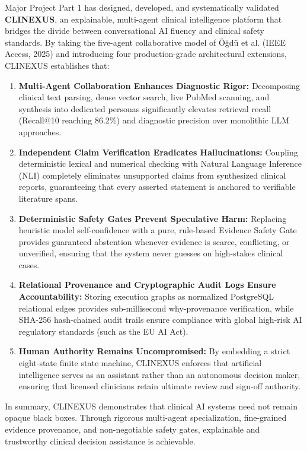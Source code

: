 \documentclass[12pt,a4paper]{report}
\begin{document}
Major Project Part 1 has designed, developed, and systematically validated \textbf{CLINEXUS}, an explainable, multi-agent clinical intelligence platform that bridges the divide between conversational AI fluency and clinical safety standards. By taking the five-agent collaborative model of Öğdü et al. (IEEE Access, 2025) and introducing four production-grade architectural extensions, CLINEXUS establishes that:
\begin{enumerate}
    \item \textbf{Multi-Agent Collaboration Enhances Diagnostic Rigor:} Decomposing clinical text parsing, dense vector search, live PubMed scanning, and synthesis into dedicated personas significantly elevates retrieval recall (Recall@10 reaching 86.2\%) and diagnostic precision over monolithic LLM approaches.
    \item \textbf{Independent Claim Verification Eradicates Hallucinations:} Coupling deterministic lexical and numerical checking with Natural Language Inference (NLI) completely eliminates unsupported claims from synthesized clinical reports, guaranteeing that every asserted statement is anchored to verifiable literature spans.
    \item \textbf{Deterministic Safety Gates Prevent Speculative Harm:} Replacing heuristic model self-confidence with a pure, rule-based Evidence Safety Gate provides guaranteed abstention whenever evidence is scarce, conflicting, or unverified, ensuring that the system never guesses on high-stakes clinical cases.
    \item \textbf{Relational Provenance and Cryptographic Audit Logs Ensure Accountability:} Storing execution graphs as normalized PostgreSQL relational edges provides sub-millisecond why-provenance verification, while SHA-256 hash-chained audit trails ensure compliance with global high-risk AI regulatory standards (such as the EU AI Act).
    \item \textbf{Human Authority Remains Uncompromised:} By embedding a strict eight-state finite state machine, CLINEXUS enforces that artificial intelligence serves as an assistant rather than an autonomous decision maker, ensuring that licensed clinicians retain ultimate review and sign-off authority.
\end{enumerate}

In summary, CLINEXUS demonstrates that clinical AI systems need not remain opaque black boxes. Through rigorous multi-agent specialization, fine-grained evidence provenance, and non-negotiable safety gates, explainable and trustworthy clinical decision assistance is achievable.
\end{document}

